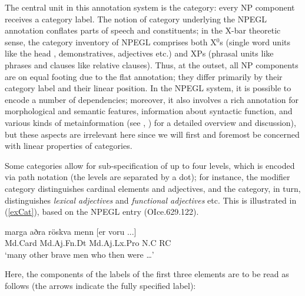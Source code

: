 \documentclass[output=paper,colorlinks,citecolor=brown,draft]{langscibook}
\begin{document}
The central unit in this annotation system is the category: every NP component receives a category label. The notion of category underlying the NPEGL annotation conflates parts of speech and constituents; in the X-bar theoretic sense, the category inventory of NPEGL comprises both X$^0$s (single word units like the head , demonstratives, adjectives etc.) and XPs (phrasal units like  phrases and clauses like relative clauses). Thus, at the outset, all NP components are on equal footing due to the flat annotation; they differ primarily by their category label and their linear position. In the NPEGL system, it is possible to encode a number of dependencies; moreover, it also involves a rich annotation for morphological and semantic features, information about syntactic function, and various kinds of metainformation (see , \citealt{Pfaff2019Annot}) for a detailed overview and discussion), but these aspects are irrelevant here since we will first and foremost be concerned with linear properties of categories.  


Some categories allow for sub-specification of up to four levels, which is encoded via path notation (the levels are separated by a dot); for instance, the modifier category distinguishes cardinal elements and adjectives, and the  category, in turn,  distinguishes \textit{lexical adjectives} and  \textit{functional adjectives} etc. This is illustrated in (\ref{exCat}), based on the NPEGL entry (OIce.629.122).   

\begin{exe}
  \ex \label{exCat}
  \glll \phantom{`}marga    aðra  röskva  menn   {[er  voru ...]}   \\
    \phantom{`}Md.Card    Md.Aj.Fn.Dt  Md.Aj.Lx.Pro  N.C {\db}RC \\
   `many  other    brave    men  {\db}{who then were} {\dots}'\\
\end{exe}

Here, the components of the labels of  the first three elements are to be read as follows (the arrows indicate the fully specified label): 
\end{document}
